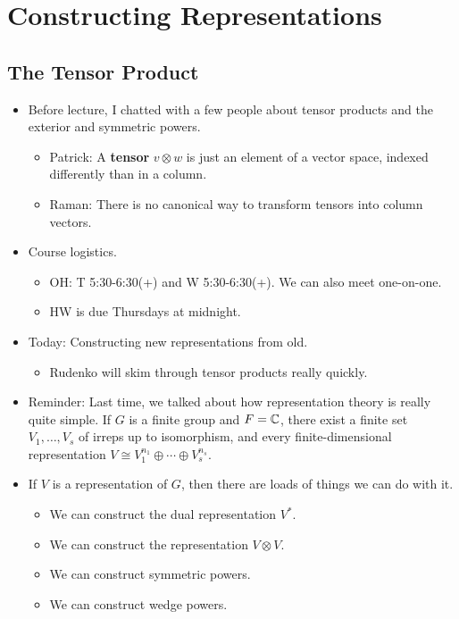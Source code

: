 \documentclass[../notes.tex]{subfiles}
\begin{document}
\chapter{Constructing Representations}
\section{The Tensor Product}
\begin{itemize}
    \item {}Before lecture, I chatted with a few people about tensor products and the exterior and symmetric powers.
    \begin{itemize}
        \item Patrick: A \textbf{tensor} $v\otimes w$ is just an element of a vector space, indexed differently than in a column.
        \item Raman: There is no canonical way to transform tensors into column vectors.
    \end{itemize}
    \item Course logistics.
    \begin{itemize}
        \item OH: T 5:30-6:30(+) and W 5:30-6:30(+). We can also meet one-on-one.
        \item HW is due Thursdays at midnight.
    \end{itemize}
    \item Today: Constructing new representations from old.
    \begin{itemize}
        \item Rudenko will skim through tensor products really quickly.
    \end{itemize}
    \item Reminder: Last time, we talked about how representation theory is really quite simple. If $G$ is a finite group and $F=\mathbb{C}$, there exist a finite set $V_1,\dots,V_s$ of irreps up to isomorphism, and every finite-dimensional representation $V\cong V_1^{n_1}\oplus\cdots\oplus V_s^{n_s}$.
    \item If $V$ is a representation of $G$, then there are loads of things we can do with it.
    \begin{itemize}
        \item We can construct the dual representation $V^*$.
        \item We can construct the representation $V\otimes V$.
        \item We can construct symmetric powers.
        \item We can construct wedge powers.

\end{itemize}
\end{itemize}
\end{document}
